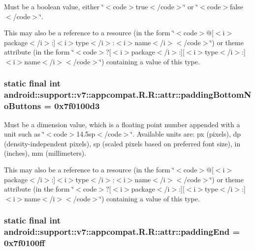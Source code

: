 Must be a boolean value, either \char`\"{}$<$code$>$true$<$/code$>$\char`\"{} or \char`\"{}$<$code$>$false$<$/code$>$\char`\"{}. 

This may also be a reference to a resource (in the form \char`\"{}$<$code$>$@\mbox{[}$<$i$>$package$<$/i$>$:\mbox{]}$<$i$>$type$<$/i$>$:$<$i$>$name$<$/i$>$$<$/code$>$\char`\"{}) or theme attribute (in the form \char`\"{}$<$code$>$?\mbox{[}$<$i$>$package$<$/i$>$:\mbox{]}\mbox{[}$<$i$>$type$<$/i$>$:\mbox{]}$<$i$>$name$<$/i$>$$<$/code$>$\char`\"{}) containing a value of this type. \hypertarget{classandroid_1_1support_1_1v7_1_1appcompat_1_1_r_1_1attr_bd8215def44558bb8fcd4074221c4de3}{
\subsubsection[{paddingBottomNoButtons}]{\setlength{\rightskip}{0pt plus 5cm}static final int android::support::v7::appcompat.R.R::attr::paddingBottomNoButtons = 0x7f0100d3}}
\label{classandroid_1_1support_1_1v7_1_1appcompat_1_1_r_1_1attr_bd8215def44558bb8fcd4074221c4de3}


Must be a dimension value, which is a floating point number appended with a unit such as \char`\"{}$<$code$>$14.5sp$<$/code$>$\char`\"{}. Available units are: px (pixels), dp (density-independent pixels), sp (scaled pixels based on preferred font size), in (inches), mm (millimeters). 

This may also be a reference to a resource (in the form \char`\"{}$<$code$>$@\mbox{[}$<$i$>$package$<$/i$>$:\mbox{]}$<$i$>$type$<$/i$>$:$<$i$>$name$<$/i$>$$<$/code$>$\char`\"{}) or theme attribute (in the form \char`\"{}$<$code$>$?\mbox{[}$<$i$>$package$<$/i$>$:\mbox{]}\mbox{[}$<$i$>$type$<$/i$>$:\mbox{]}$<$i$>$name$<$/i$>$$<$/code$>$\char`\"{}) containing a value of this type. \hypertarget{classandroid_1_1support_1_1v7_1_1appcompat_1_1_r_1_1attr_9c11c32b28c0ee627466b17e8ad2c757}{
\subsubsection[{paddingEnd}]{\setlength{\rightskip}{0pt plus 5cm}static final int android::support::v7::appcompat.R.R::attr::paddingEnd = 0x7f0100ff}}
\label{classandroid_1_1support_1_1v7_1_1appcompat_1_1_r_1_1attr_9c11c32b28c0ee627466b17e8ad2c757}


